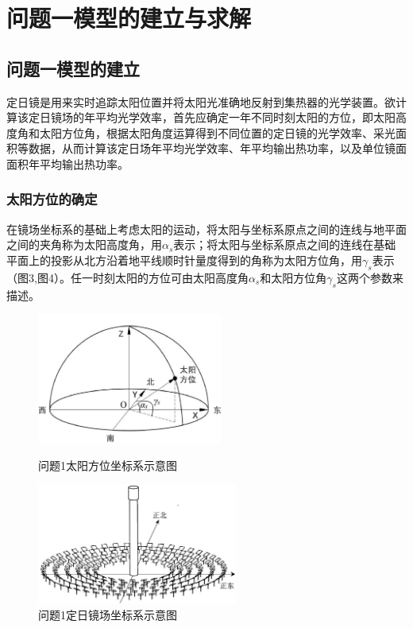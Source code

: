 \documentclass{article}
\numberwithin{equation}{subsection}
\begin{document}

\newpage
{\centering\section{问题一模型的建立与求解}}

\subsection{问题一模型的建立}

定日镜是用来实时追踪太阳位置并将太阳光准确地反射到集热器的光学装置。欲计算该定日镜场的年平均光学效率，首先应确定一年不同时刻太阳的方位，即太阳高度角和太阳方位角，根据太阳角度运算得到不同位置的定日镜的光学效率、采光面积等数据，从而计算该定日场年平均光学效率、年平均输出热功率，以及单位镜面面积年平均输出热功率。

\subsubsection{太阳方位的确定}

在镜场坐标系的基础上考虑太阳的运动，将太阳与坐标系原点之间的连线与地平面之间的夹角称为太阳高度角，用$\alpha_s$表示；将太阳与坐标系原点之间的连线在基础平面上的投影从北方沿着地平线顺时针量度得到的角称为太阳方位角，用$\gamma_s$表示（图3,图4）。任一时刻太阳的方位可由太阳高度角$\alpha_s$和太阳方位角$\gamma_s$这两个参数来描述。

\vskip 0.25cm
\begin{figure}[htbp]
	\begin{minipage}[b]{0.45\linewidth}
		\centering
		\includegraphics[width=2.4in]{问题1-1太阳方位建系图.png}
		\caption{问题1太阳方位坐标系示意图}
	\end{minipage}
	\begin{minipage}[b]{0.55\linewidth}
		\centering
		\includegraphics[width=2.6in]{问题1-1定日镜场建系图.png}
		\caption{问题1定日镜场坐标系示意图}
	\end{minipage}
\end{figure}
\end{document}
